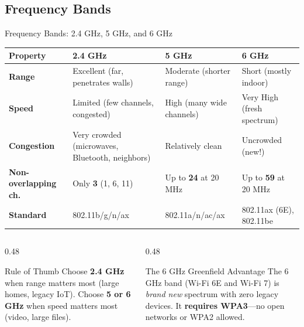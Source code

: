 \documentclass[aspectratio=169]{beamer}
\begin{document}
\subsection{Frequency Bands}

\begin{frame}[shrink=5]{Frequency Bands: 2.4 GHz, 5 GHz, and 6 GHz}
    \begin{table}[]
        \renewcommand{\arraystretch}{1.3}
        \centering
        \scriptsize
        \begin{tabular}{|p{2.0cm}|p{3.4cm}|p{3.4cm}|p{3.0cm}|}
        \hline
        \rowcolor[HTML]{EFEFEF}
        \textbf{Property} & \textbf{2.4 GHz} & \textbf{5 GHz} & \textbf{6 GHz} \\ \hline
        \textbf{Range} & Excellent (far, penetrates walls) & Moderate (shorter range) & Short (mostly indoor) \\ \hline
        \textbf{Speed} & Limited (few channels, congested) & High (many wide channels) & Very High (fresh spectrum) \\ \hline
        \textbf{Congestion} & Very crowded (microwaves, Bluetooth, neighbors) & Relatively clean & Uncrowded (new!) \\ \hline
        \textbf{Non-overlapping ch.} & Only \textbf{3} (1, 6, 11) & Up to \textbf{24} at 20 MHz & Up to \textbf{59} at 20 MHz \\ \hline
        \textbf{Standard} & 802.11b/g/n/ax & 802.11a/n/ac/ax & 802.11ax (6E), 802.11be \\ \hline
        \end{tabular}
    \end{table}
    \vspace{0.2em}
    \begin{columns}[T]
        \begin{column}{0.48\textwidth}
            \begin{exampleblock}{Rule of Thumb}
                \footnotesize
                Choose \textbf{2.4 GHz} when range matters most (large homes, legacy IoT). Choose \textbf{5 or 6 GHz} when speed matters most (video, large files).
            \end{exampleblock}
        \end{column}
        \begin{column}{0.48\textwidth}
            \begin{block}{The 6 GHz Greenfield Advantage}
                \footnotesize
                The 6 GHz band (Wi-Fi 6E and Wi-Fi 7) is \emph{brand new} spectrum with zero legacy devices. It \textbf{requires WPA3}---no open networks or WPA2 allowed.
            \end{block}
        \end{column}
    \end{columns}
\end{frame}
\end{document}
